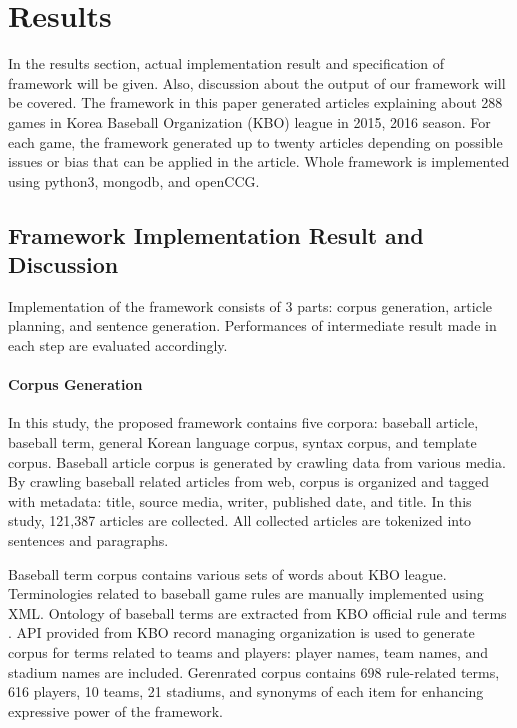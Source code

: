 \documentclass[11pt,letterpaper]{article}
\begin{document}
\section{Results} 

In the results section, actual implementation result and specification of framework will be given. Also, discussion about the output of our framework will be covered. The framework in this paper generated articles explaining about 288 games in Korea Baseball Organization (KBO) league in 2015, 2016 season. For each game, the framework generated up to twenty articles depending on possible issues or bias that can be applied in the article. Whole framework is implemented using python3, mongodb, and openCCG. 

\subsection{Framework Implementation Result and Discussion}

Implementation of the framework consists of 3 parts: corpus generation, article planning, and sentence generation. Performances of intermediate result made in each step are evaluated accordingly. 

\paragraph{Corpus Generation} 

In this study, the proposed framework contains five corpora: baseball article, baseball term, general Korean language corpus, syntax corpus, and template corpus. 
Baseball article corpus is generated by crawling data from various media. By crawling baseball related articles from web, corpus is organized and tagged with metadata: title, source media, writer, published date, and title. In this study, 121,387 articles are collected. All collected articles are tokenized into sentences and paragraphs. 

Baseball term corpus contains various sets of words about KBO league. Terminologies related to baseball game rules are manually implemented using XML. Ontology of baseball terms are extracted from KBO official rule and terms \cite{kbo}.  API provided from KBO record managing organization is used to generate corpus for terms related to teams and players: player names, team names, and stadium names are included. Gerenrated corpus contains 698 rule-related terms, 616 players, 10 teams, 21 stadiums, and synonyms of each item for enhancing expressive power of the framework. 
\end{document}
